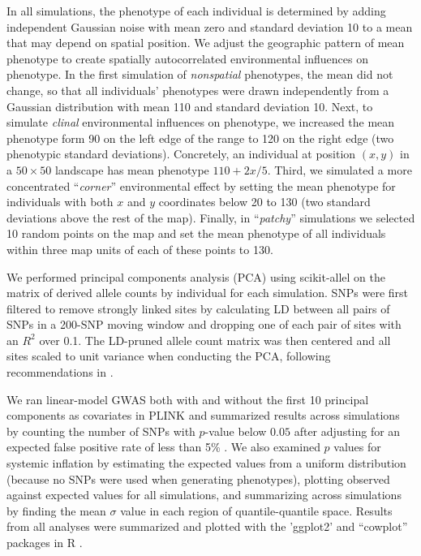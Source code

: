\documentclass[11pt,twoside,lineno]{preprint}
\begin{document}
In all simulations, the phenotype of each individual
is determined by adding independent Gaussian noise with mean zero and standard deviation 10
to a mean that may depend on spatial position.
We adjust the geographic pattern of mean phenotype to create spatially autocorrelated environmental influences on phenotype.
In the first simulation of \emph{nonspatial} phenotypes, the mean did not change,
so that all individuals' phenotypes were drawn independently from a Gaussian distribution with mean 110 and standard deviation 10.
Next, to simulate \emph{clinal} environmental influences on phenotype, 
we increased the mean phenotype form 90 on the left edge of the range to 120 on the right edge (two phenotypic standard deviations).
Concretely, an individual at position $(x,y)$ in a $50 \times 50$ landscape has mean phenotype $110 + 2x / 5$.
Third, we simulated a more concentrated ``\emph{corner}'' environmental effect by setting the mean phenotype 
for individuals with both $x$ and $y$ coordinates below 20 to 130 (two standard deviations above the rest of the map). 
Finally, in ``\emph{patchy}'' simulations we selected 10 random points on the map
and set the mean phenotype of all individuals within three map units of each of these points
to 130.

We performed principal components analysis (PCA) using scikit-allel \citep{Miles2017} on the matrix of derived allele counts by individual for each simulation. 
SNPs were first filtered to remove strongly linked sites by calculating LD between all pairs of SNPs in a 200-SNP moving window and dropping one of each pair of sites with an $R^2$ over 0.1. The LD-pruned allele count matrix was then centered and all sites scaled to unit variance when conducting the PCA, following recommendations in \citep{Patterson2006}.   

We ran linear-model GWAS both with and without the first 10 principal components as covariates in PLINK and summarized results across simulations by counting the number of SNPs 
with $p$-value below $0.05$ after adjusting for an expected false positive rate of less than 5\% \citep{benjamini2001control}. 
We also examined $p$ values for systemic inflation by estimating the expected values from a uniform distribution (because no SNPs were used when generating phenotypes), plotting observed against expected values for all simulations, and summarizing across simulations by finding the mean $\sigma$ value in each region of quantile-quantile space. 
Results from all analyses were summarized and plotted with the 'ggplot2' \citep{Wickham2016} and ``cowplot'' \citep{Wilke2019} packages in R \citep{Rcore2018}. 
\end{document}
